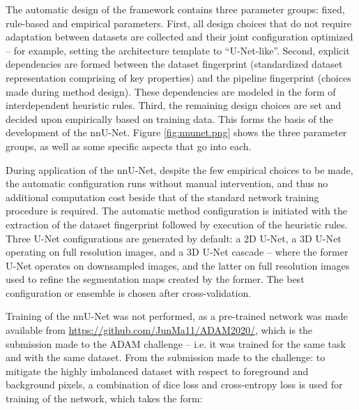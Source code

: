 The automatic design of the framework contains three parameter groups: fixed, rule-based and empirical parameters. First, all design choices that do not require adaptation between datasets are collected and their joint configuration optimized -- for example, setting the architecture template to ``U-Net-like''. Second, explicit dependencies are formed between the dataset fingerprint (standardized dataset representation comprising of key properties) and the pipeline fingerprint (choices made during method design). These dependencies are modeled in the form of interdependent heuristic rules. Third, the remaining design choices are set and decided upon empirically based on training data. This forms the basis of the development of the nnU-Net. Figure \ref{fig:nnunet.png} shows the three parameter groups, as well as some specific aspects that go into each.


During application of the nnU-Net, despite the few empirical choices to be made, the automatic configuration runs without manual intervention, and thus no additional computation cost beside that of the standard network training procedure is required. The automatic method configuration is initiated with the extraction of the dataset fingerprint followed by execution of the heuristic rules. Three U-Net configurations are generated by default: a 2D U-Net, a 3D U-Net operating on full resolution images, and a 3D U-Net cascade -- where the former U-Net operates on downsampled images, and the latter on full resolution images used to refine the segmentation maps created by the former. The best configuration or ensemble is chosen after cross-validation. 


Training of the nnU-Net was not performed, as a pre-trained network was made available from \href{https://github.com/JunMa11/ADAM2020/}{https://github.com/JunMa11/ADAM2020/}, which is the submission made to the ADAM challenge -- i.e. it was trained for the same task and with the same dataset. From the submission made to the challenge: to mitigate the highly imbalanced dataset with respect to foreground and background pixels, a combination of dice loss and cross-entropy loss is used for training of the network, which takes the form:

